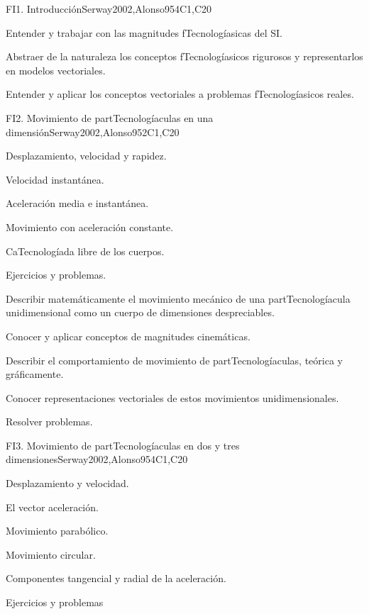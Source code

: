 \begin{syllabus}
\begin{unit}{FI1. Introducción}{}{Serway2002,Alonso95}{4}{C1,C20}
   \begin{learningoutcomes}
      \item Entender y trabajar con las magnitudes fTecnologíasicas del SI.
      \item Abstraer de la naturaleza los conceptos fTecnologíasicos rigurosos y representarlos en modelos vectoriales.
      \item Entender y aplicar los conceptos vectoriales a problemas fTecnologíasicos reales.
   \end{learningoutcomes}
\end{unit}

\begin{unit}{FI2. Movimiento de partTecnologíaculas en una dimensión}{}{Serway2002,Alonso95}{2}{C1,C20}
\begin{topics}
      \item Desplazamiento, velocidad y rapidez.
      \item Velocidad instantánea.
      \item Aceleración media e instantánea.
      \item Movimiento con aceleración constante.
      \item CaTecnologíada libre de los cuerpos.
      \item Ejercicios y problemas.
    \end{topics}
   \begin{learningoutcomes}
      \item Describir matemáticamente el movimiento mecánico de una partTecnologíacula unidimensional como un cuerpo de dimensiones despreciables.
      \item Conocer y aplicar conceptos de magnitudes cinemáticas.
      \item Describir el comportamiento de movimiento de partTecnologíaculas, teórica y gráficamente.
      \item Conocer representaciones vectoriales de estos movimientos unidimensionales.
      \item Resolver problemas.
   \end{learningoutcomes}
\end{unit}

\begin{unit}{FI3. Movimiento de partTecnologíaculas en dos y tres dimensiones}{}{Serway2002,Alonso95}{4}{C1,C20}
\begin{topics}
      \item Desplazamiento y velocidad.
      \item El vector aceleración.
      \item Movimiento parabólico.
      \item Movimiento circular.
      \item Componentes tangencial y radial de la aceleración.
      \item Ejercicios y problemas
\end{topics}


\end{unit}
\end{syllabus}
